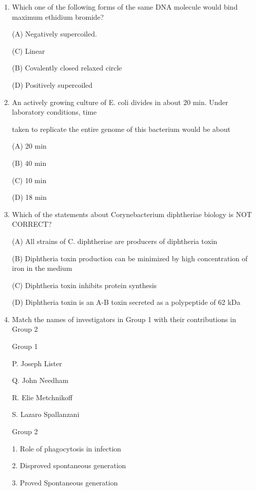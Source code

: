 \documentclass[journal]{IEEEtran}
\begin{document}
\begin{enumerate}
{(C) BNCAXPTMDOW

(D) BDQWMNCAXPT
}
\item {Which one of the following forms of the same DNA molecule would bind maximum ethidium bromide?

(A) Negatively supercoiled.

(C) Linear

(B) Covalently closed relaxed circle

(D) Positively supercoiled
}
\item {An actively growing culture of E. coli divides in about 20 min. Under laboratory conditions, time

taken to replicate the entire genome of this bacterium would be about

(A) 20 min

(B) 40 min

(C) 10 min

(D) 18 min
}
\item {Which of the statements about Corynebacterium diphtheriae biology is NOT CORRECT?

(A) All strains of C. diphtheriae are producers of diphtheria toxin

(B) Diphtheria toxin production can be minimized by high concentration of iron in the medium

(C) Diphtheria toxin inhibits protein synthesis

(D) Diphtheria toxin is an A-B toxin secreted as a polypeptide of 62 kDa
}
\item {Match the names of investigators in Group 1 with their contributions in Group 2}
\begin{minipage}{0.5\textwidth}
	\begin{flushleft}


Group 1

P. Joseph Lister

Q. John Needham

R. Elie Metchnikoff

S. Lazaro Spallanzani
		\end{flushleft}
		\end{minipage}
	\begin{minipage}{0.5\textwidth}
		\begin{flushleft}

Group 2

1. Role of phagocytosis in infection


2. Disproved spontaneous generation


3. Proved Spontaneous generation



\end{flushleft}
\end{minipage}
\end{enumerate}
\end{document}
